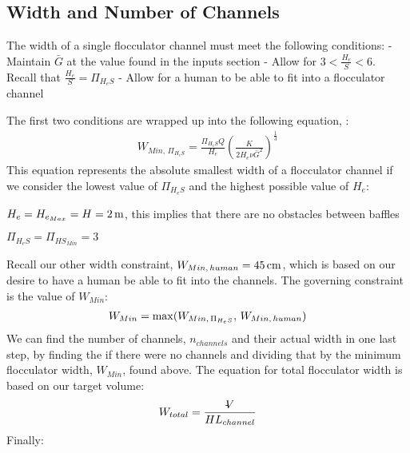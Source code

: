 \documentclass[letterpaper,10pt,english]{sphinxmanual}
\begin{document}
\subsection{Width and Number of Channels}
\label{\detokenize{Flocculation/Floc_Design:width-and-number-of-channels}}
The width of a single flocculator channel must meet the following conditions: - Maintain \(\bar G\) at the value found in the inputs section - Allow for \(3 < \frac{H_e}{S} < 6\). Recall that \(\frac{H_e}{S} = \Pi_{H_eS}\) - Allow for a human to be able to fit into a flocculator channel

The first two conditions are wrapped up into the following equation, {\hyperref[\detokenize{Flocculation/Floc_Derivations:title-flocculation-derivations}]{}}:
\begin{equation}\label{equation:Flocculation/Floc_Design:Flocculation/Floc_Design:26}
\begin{split}W_{Min, \, \Pi_{H_eS}} = \frac{\Pi_{H_eS}Q}{H_e}\left( \frac{K}{2 H_e \nu \bar G^2} \right)^\frac{1}{3}\end{split}
\end{equation}
This equation represents the absolute smallest width of a flocculator channel if we consider the lowest value of \(\Pi_{H_eS}\) and the highest possible value of \(H_e\):

\begin{DUlineblock}{0em}
\item[] \(H_e = H_{e_{Max}} = H = 2 \, {\rm m}\), this implies that there
are no obstacles between baffles
\item[] \(\Pi_{H_eS} = \Pi_{ {HS}_{Min} } = 3\)
\end{DUlineblock}

Recall our other width constraint, \(W_{Min, \, human} = 45 \, {\rm cm}\), which is based on our desire to have a human be able to fit into the channels. The governing constraint is the  value of \(W_{Min}\):
\begin{equation}\label{equation:Flocculation/Floc_Design:Flocculation/Floc_Design:27}
\begin{split}W_{Min} = {\rm max}(W_{Min, \, \Pi_{H_eS}}, \, W_{Min, \, human})\end{split}
\end{equation}
We can find the number of channels, \(n_{channels}\) and their actual width in one last step, by finding the  if there were no channels and dividing that by the minimum flocculator width, \(W_{Min}\), found above. The equation for total flocculator width is based on our target volume:
\begin{equation}\label{equation:Flocculation/Floc_Design:Flocculation/Floc_Design:28}
\begin{split}W_{total} = \frac{\rlap{-} V}{H L_{channel}}\end{split}
\end{equation}
Finally:
\end{document}
